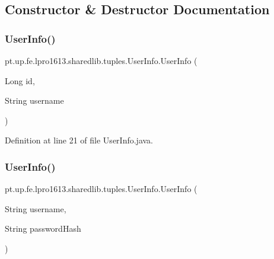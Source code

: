 \subsection{Constructor \& Destructor Documentation}
\hypertarget{classpt_1_1up_1_1fe_1_1lpro1613_1_1sharedlib_1_1tuples_1_1_user_info_aa0641524b5f4629c3e3ec83bd0aa70fb}{}\label{classpt_1_1up_1_1fe_1_1lpro1613_1_1sharedlib_1_1tuples_1_1_user_info_aa0641524b5f4629c3e3ec83bd0aa70fb} 
\subsubsection{\texorpdfstring{User\+Info()}{UserInfo()}\hspace{0.1cm}{\footnotesize\ttfamily [1/3]}}
{\footnotesize\ttfamily pt.\+up.\+fe.\+lpro1613.\+sharedlib.\+tuples.\+User\+Info.\+User\+Info (\begin{DoxyParamCaption}\item[{Long}]{id,  }\item[{String}]{username }\end{DoxyParamCaption})}



Definition at line 21 of file User\+Info.\+java.

\hypertarget{classpt_1_1up_1_1fe_1_1lpro1613_1_1sharedlib_1_1tuples_1_1_user_info_a414fb70e0e7339620e8d4dca4d7866a2}{}\label{classpt_1_1up_1_1fe_1_1lpro1613_1_1sharedlib_1_1tuples_1_1_user_info_a414fb70e0e7339620e8d4dca4d7866a2} 
\subsubsection{\texorpdfstring{User\+Info()}{UserInfo()}\hspace{0.1cm}{\footnotesize\ttfamily [2/3]}}
{\footnotesize\ttfamily pt.\+up.\+fe.\+lpro1613.\+sharedlib.\+tuples.\+User\+Info.\+User\+Info (\begin{DoxyParamCaption}\item[{String}]{username,  }\item[{String}]{password\+Hash }\end{DoxyParamCaption})}



